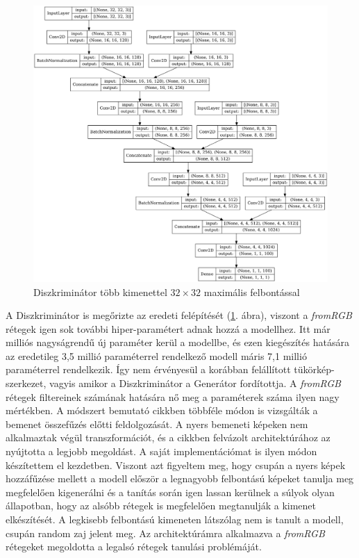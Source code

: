 \begin{figure}[h]
	\centering
	\includegraphics[width=15cm]{images/msgDiscriminator.png}
	\caption{Diszkriminátor több kimenettel $32 \times 32$ maximális felbontással}
	\label{fig:msgDiscriminator}
\end{figure}

A Diszkriminátor is megőrizte az eredeti felépítését (\ref{fig:msgDiscriminator}. ábra), viszont a \textit{fromRGB} rétegek igen sok további hiper-paramétert adnak hozzá a modellhez. Itt már milliós nagyságrendű új paraméter kerül a modellbe, és ezen kiegészítés hatására az eredetileg 3,5 millió paraméterrel rendelkező modell máris 7,1 millió paraméterrel rendelkezik. Így nem érvényesül a korábban felállított tükörkép-szerkezet, vagyis amikor a Diszkriminátor a Generátor fordítottja. A \textit{fromRGB} rétegek filtereinek számának hatására nő meg a paraméterek száma ilyen nagy mértékben. A módszert bemutató cikkben többféle módon is vizsgálták a bemenet összefűzés előtti feldolgozását. A nyers bemeneti képeken nem alkalmaztak végül transzformációt, és a cikkben felvázolt architektúrához az nyújtotta a legjobb megoldást. A saját implementációmat is ilyen módon készítettem el kezdetben. Viszont azt figyeltem meg, hogy csupán a nyers képek hozzáfűzése mellett a modell először a legnagyobb felbontású képeket tanulja meg megfelelően kigenerálni és a tanítás során igen lassan kerülnek a súlyok olyan állapotban, hogy az alsóbb rétegek is megfelelően megtanulják a kimenet elkészítését. A legkisebb felbontású kimeneten látszólag nem is tanult a modell, csupán random zaj jelent meg. Az architektúrámra alkalmazva a \textit{fromRGB} rétegeket megoldotta a legalsó rétegek tanulási problémáját.

